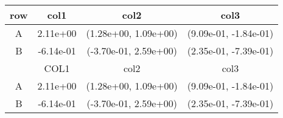 \begin{tabular}{cccc}
\toprule
row&col1&col2&col3\tabularnewline
\midrule
A&2.11e+00& (1.28e+00, 1.09e+00)& (9.09e-01, -1.84e-01)\tabularnewline
B&-6.14e-01& (-3.70e-01, 2.59e+00)& (2.35e-01, -7.39e-01)\tabularnewline
\midrule
&COL1&col2&col3\tabularnewline
\midrule
A&2.11e+00& (1.28e+00, 1.09e+00)& (9.09e-01, -1.84e-01)\tabularnewline
B&-6.14e-01& (-3.70e-01, 2.59e+00)& (2.35e-01, -7.39e-01)\tabularnewline
\bottomrule
\end{tabular}
